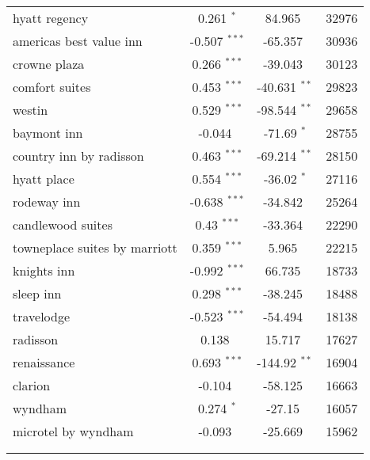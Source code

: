 \begin{table}[!htbp]
{\begin{tabular}{@{\extracolsep{5pt}}lccc}
hyatt regency	&	0.261	$	^	{*} 	$	&	84.965	$			$	&	32976	\\
americas best value inn	&	-0.507	$	^	{***} 	$	&	-65.357	$			$	&	30936	\\
crowne plaza	&	0.266	$	^	{***} 	$	&	-39.043	$			$	&	30123	\\
comfort suites	&	0.453	$	^	{***} 	$	&	-40.631	$	^	{**} 	$	&	29823	\\
westin	&	0.529	$	^	{***} 	$	&	-98.544	$	^	{**} 	$	&	29658	\\
baymont inn	&	-0.044	$	 		$	&	-71.69	$	^	{*} 	$	&	28755	\\
country inn by radisson	&	0.463	$	^	{***} 	$	&	-69.214	$	^	{**} 	$	&	28150	\\
hyatt place	&	0.554	$	^	{***} 	$	&	-36.02	$	^	{*} 	$	&	27116	\\
rodeway inn	&	-0.638	$	^	{***} 	$	&	-34.842	$			$	&	25264	\\
candlewood suites	&	0.43	$	^	{***} 	$	&	-33.364	$			$	&	22290	\\
towneplace suites by marriott	&	0.359	$	^	{***} 	$	&	5.965	$			$	&	22215	\\
knights inn	&	-0.992	$	^	{***} 	$	&	66.735	$			$	&	18733	\\
sleep inn	&	0.298	$	^	{***} 	$	&	-38.245	$			$	&	18488	\\
travelodge	&	-0.523	$	^	{***} 	$	&	-54.494	$			$	&	18138	\\
radisson	&	0.138	$	 		$	&	15.717	$			$	&	17627	\\
renaissance	&	0.693	$	^	{***} 	$	&	-144.92	$	^	{**} 	$	&	16904	\\
clarion	&	-0.104	$	 		$	&	-58.125	$			$	&	16663	\\
wyndham	&	0.274	$	^	{*} 	$	&	-27.15	$			$	&	16057	\\
microtel by wyndham	&	-0.093	$	 		$	&	-25.669	$			$	&	15962	\\

\\[-1.8ex]\hline 
\hline
\\[-1.8ex] 
\end{tabular} 
}
\end{table} 